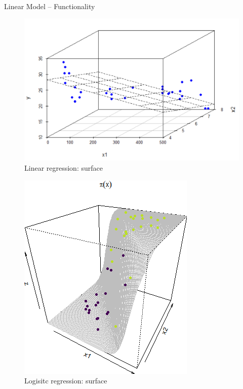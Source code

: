 \documentclass[11pt,compress,t,notes=noshow, xcolor=table]{beamer}
\begin{document}
\begin{frame}{Linear Model -- Functionality}
\begin{itemize}
\end{itemize}



\footnotesize



\begin{minipage}{0.32\textwidth}
  \begin{center}
  \begin{figure}[h!]
    \caption{Linear regression: surface}
    \includegraphics[height=0.6\textwidth,keepaspectratio=true]{figure/linreg-surface.png}
  \end{figure}
  \end{center}
\end{minipage}
      \begin{minipage}{0.32\textwidth}
        \begin{center}
          \begin{figure}[h!]
           \caption{Logisitc regression: surface}
          \includegraphics[height=0.6\textwidth, keepaspectratio=true]{figure/logreg-2vars-surface.png}

\end{figure}
\end{center}
\end{minipage}
\end{frame}
\end{document}
